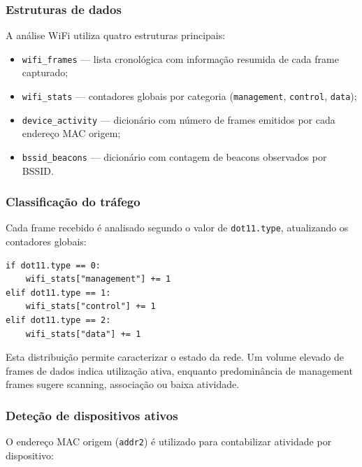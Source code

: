 \documentclass[a4paper,12pt]{article}
\begin{document}
\subsubsection{Estruturas de dados}

A análise WiFi utiliza quatro estruturas principais:

\begin{itemize}
    \item \texttt{wifi\_frames} — lista cronológica com informação resumida de cada frame capturado;
    \item \texttt{wifi\_stats} — contadores globais por categoria (\texttt{management}, \texttt{control}, \texttt{data});
    \item \texttt{device\_activity} — dicionário com número de frames emitidos por cada endereço MAC origem;
    \item \texttt{bssid\_beacons} — dicionário com contagem de beacons observados por BSSID.
\end{itemize}

\subsubsection{Classificação do tráfego}

Cada frame recebido é analisado segundo o valor de \texttt{dot11.type}, atualizando os contadores globais:

\vspace{0.5em}

\begin{lstlisting}[style=python]
if dot11.type == 0:
    wifi_stats["management"] += 1
elif dot11.type == 1:
    wifi_stats["control"] += 1
elif dot11.type == 2:
    wifi_stats["data"] += 1
\end{lstlisting}

Esta distribuição permite caracterizar o estado da rede. Um volume elevado de frames de dados indica utilização ativa, enquanto predominância de management frames sugere scanning, associação ou baixa atividade.

\subsubsection{Deteção de dispositivos ativos}

O endereço MAC origem (\texttt{addr2}) é utilizado para contabilizar atividade por dispositivo:

\vspace{0.5em}
\end{document}
